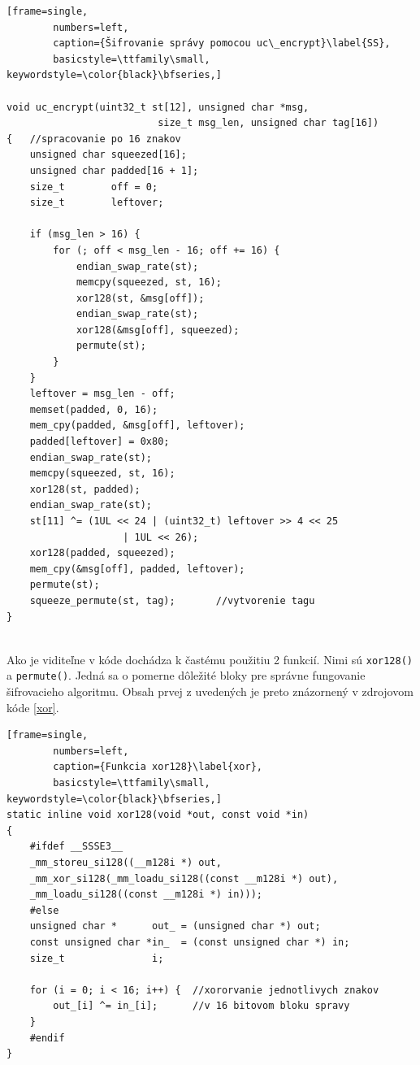 \begin{minipage}{\linewidth} 	
	\begin{lstlisting}[frame=single,
		numbers=left,
		caption={Šifrovanie správy pomocou uc\_encrypt}\label{SS},
		basicstyle=\ttfamily\small, keywordstyle=\color{black}\bfseries,]
 		
void uc_encrypt(uint32_t st[12], unsigned char *msg, 
					      size_t msg_len, unsigned char tag[16])
{	//spracovanie po 16 znakov
	unsigned char squeezed[16];
	unsigned char padded[16 + 1];
	size_t        off = 0;
	size_t        leftover;
	
	if (msg_len > 16) {
		for (; off < msg_len - 16; off += 16) {
			endian_swap_rate(st);
			memcpy(squeezed, st, 16);
			xor128(st, &msg[off]);
			endian_swap_rate(st);
			xor128(&msg[off], squeezed);
			permute(st);
		}
	}
	leftover = msg_len - off;
	memset(padded, 0, 16);
	mem_cpy(padded, &msg[off], leftover);
	padded[leftover] = 0x80;
	endian_swap_rate(st);
	memcpy(squeezed, st, 16);
	xor128(st, padded);
	endian_swap_rate(st);
	st[11] ^= (1UL << 24 | (uint32_t) leftover >> 4 << 25
				    | 1UL << 26); 
	xor128(padded, squeezed);
	mem_cpy(&msg[off], padded, leftover);
	permute(st);
	squeeze_permute(st, tag);		//vytvorenie tagu
}
  	\end{lstlisting}
\end{minipage}\\ 

Ako je viditeľne v kóde dochádza k častému použitiu 2 funkcií. Nimi sú  \lstinline|xor128()| a  \lstinline|permute()|. Jedná sa o pomerne dôležité bloky pre správne fungovanie šifrovacieho algoritmu. Obsah prvej z uvedených je preto znázornený v zdrojovom kóde \ref{xor}.

\begin{minipage}{\linewidth} 	
	\begin{lstlisting}[frame=single,
		numbers=left,
		caption={Funkcia xor128}\label{xor},
		basicstyle=\ttfamily\small, keywordstyle=\color{black}\bfseries,]
static inline void xor128(void *out, const void *in)
{
	#ifdef __SSSE3__
	_mm_storeu_si128((__m128i *) out,
	_mm_xor_si128(_mm_loadu_si128((const __m128i *) out),
	_mm_loadu_si128((const __m128i *) in)));
	#else
	unsigned char *      out_ = (unsigned char *) out;
	const unsigned char *in_  = (const unsigned char *) in;
	size_t               i;
	
	for (i = 0; i < 16; i++) {	//xororvanie jednotlivych znakov 
		out_[i] ^= in_[i];		//v 16 bitovom bloku spravy
	}
	#endif
}
  	\end{lstlisting}
\end{minipage}\\ 

